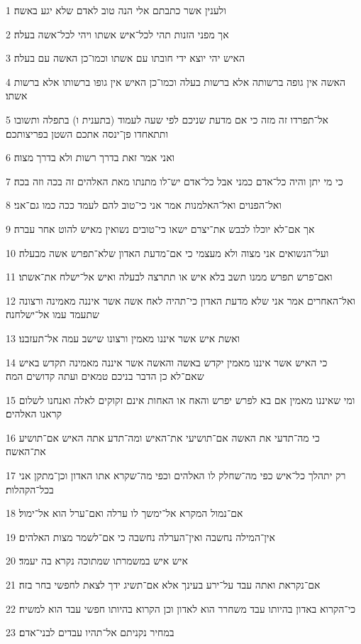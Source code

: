 \par 1 ולענין אשר כתבתם אלי הנה טוב לאדם שלא יגע באשה׃
\par 2 אך מפני הזנות תהי לכל־איש אשתו ויהי לכל־אשה בעלה׃
\par 3 האיש יהי יוצא ידי חובתו עם אשתו וכמו־כן האשה עם בעלה׃
\par 4 האשה אין גופה ברשותה אלא ברשות בעלה וכמו־כן האיש אין גופו ברשותו אלא ברשות אשתו׃
\par 5 אל־תפרדו זה מזה כי אם מדעת שניכם לפי שעה לעמוד (בתענית ו) בתפלה ותשובו ותתאחדו פן־ינסה אתכם השטן בפריצותכם׃
\par 6 ואני אמר זאת בדרך רשות ולא בדרך מצוה׃
\par 7 כי מי יתן והיה כל־אדם כמני אבל כל־אדם יש־לו מתנתו מאת האלהים זה בכה וזה בכה׃
\par 8 ואל־הפנוים ואל־האלמנות אמר אני כי־טוב להם לעמד ככה כמו גם־אני׃
\par 9 אך אם־לא יוכלו לכבש את־יצרם ישאו כי־טובים נשואין מאיש להוט אחר עברה׃
\par 10 ועל־הנשואים אני מצוה ולא מעצמי כי אם־מדעת האדון שלא־תפרש אשה מבעלה׃
\par 11 ואם־פרש תפרש ממנו תשב בלא איש או תתרצה לבעלה ואיש אל־ישלח את־אשתו׃
\par 12 ואל־האחרים אמר אני שלא מדעת האדון כי־תהיה לאח אשה אשר איננה מאמינה ורצונה שתעמד עמו אל־ישלחנה׃
\par 13 ואשת איש אשר איננו מאמין ורצונו שישב עמה אל־תעזבנו׃
\par 14 כי האיש אשר איננו מאמין יקדש באשה והאשה אשר איננה מאמינה תקדש באיש שאם־לא כן הדבר בניכם טמאים ועתה קדושים המה׃
\par 15 ומי שאיננו מאמין אם בא לפרש יפרש והאח או האחות אינם זקוקים לאלה ואנחנו לשלום קראנו האלהים׃
\par 16 כי מה־תדעי את האשה אם־תושיעי את־האיש ומה־תדע אתה האיש אם־תושיע את־האשה׃
\par 17 רק יתהלך כל־איש כפי מה־שחלק לו האלהים וכפי מה־שקרא אתו האדון וכן־מתקן אני בכל־הקהלות׃
\par 18 אם־נמול המקרא אל־ימשך לו ערלה ואם־ערל הוא אל־ימול׃
\par 19 אין־המילה נחשבה ואין־הערלה נחשבה כי אם־לשמר מצות האלהים׃
\par 20 איש איש במשמרתו שמתוכה נקרא בה יעמד׃
\par 21 אם־נקראת ואתה עבד על־ירע בעינך אלא אם־תשיג ידך לצאת לחפשי בחר בזה׃
\par 22 כי־הקרוא באדון בהיותו עבד משחרר הוא לאדון וכן הקרוא בהיותו חפשי עבד הוא למשיח׃
\par 23 במחיר נקניתם אל־תהיו עבדים לבני־אדם׃
